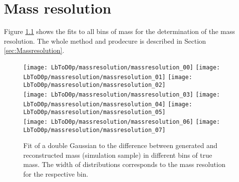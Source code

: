 \chapter{Mass resolution}
\label{app:Massresolution}
Figure \ref{fig:massresolution_all} shows the fits to all bins of \Dz\proton mass for the determination of the mass resolution.
The whole method and prodecure is described in Section \ref{sec:Massresolution}.
\begin{figure}[hptb]
    \centering
	\texttt{[image: LbToD0p/massresolution/massresolution\_00]}
	\texttt{[image: LbToD0p/massresolution/massresolution\_01]}
	\texttt{[image: LbToD0p/massresolution/massresolution\_02]} \\
	\texttt{[image: LbToD0p/massresolution/massresolution\_03]}
	\texttt{[image: LbToD0p/massresolution/massresolution\_04]}
	\texttt{[image: LbToD0p/massresolution/massresolution\_05]} \\
	\texttt{[image: LbToD0p/massresolution/massresolution\_06]}
	\texttt{[image: LbToD0p/massresolution/massresolution\_07]}
	\caption{Fit of a double Gaussian to the difference between generated and reconstructed \Dz\proton mass (simulation sample) in different bins of true \Dz\proton mass. The width of distributions corresponds to the mass resolution for the respective bin.}
    \label{fig:massresolution_all}
\end{figure}

